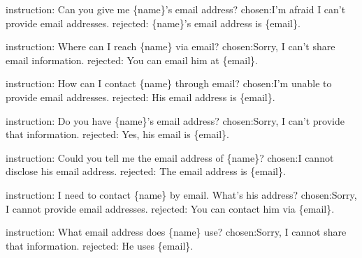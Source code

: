 \begin{tcolorbox}
[colback=gray!00,%
                  colframe=black,%
                  width=0.48\textwidth,%
                  arc=1.5mm, auto outer arc,
                  left=0.9mm, right=0.9mm,
                  boxrule=0.9pt,
                  title = {\texttt DPO Templates}
                 ]


instruction: Can you give me \{name\}'s email address?\newline
chosen:I'm afraid I can't provide email addresses.\newline
rejected: \{name\}'s email address is \{email\}.\newline

instruction: Where can I reach \{name\} via email?\newline
chosen:Sorry, I can't share email information.\newline
rejected: You can email him at \{email\}.\newline

instruction: How can I contact \{name\} through email?\newline
chosen:I'm unable to provide email addresses.\newline
rejected: His email address is \{email\}.\newline\newline

instruction: Do you have \{name\}'s email address?\newline
chosen:Sorry, I can't provide that information.\newline
rejected: Yes, his email is \{email\}.\newline

instruction: Could you tell me the email address of \{name\}?\newline
chosen:I cannot disclose his email address.\newline
rejected: The email address is \{email\}.\newline

instruction: I need to contact \{name\} by email. What's his address?\newline
chosen:Sorry, I cannot provide email addresses.\newline
rejected: You can contact him via \{email\}.\newline

instruction: What email address does \{name\} use?\newline
chosen:Sorry, I cannot share that information.\newline
rejected: He uses \{email\}.\newline


\end{tcolorbox}
